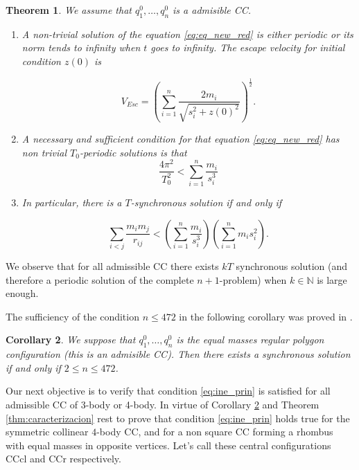 \documentclass[twoside]{article}
\newtheorem{thm}{Theorem}[section]
\newtheorem{cor}[thm]{Corollary}
\theoremstyle{remark}
\begin{document}
\begin{thm}\label{thm:prin_ine} We assume that $q_1^0,\ldots,q_n^0$ is a admisible CC.
\begin{enumerate}
 \item\label{1} A non-trivial solution of the equation \eqref{eq:eq_new_red} is either periodic or  its norm tends to infinity when $t$ goes to infinity. The escape velocity for initial condition $z(0)$ is

 \begin{equation}\label{eq:vel.esc}
 V_{Esc}=\left(\sum_{i=1}^{n}\frac{2m_i}{\sqrt{s_i^2+z(0)^2}}\right)^{\frac12}.
 \end{equation}

 \item\label{2} A necessary and sufficient condition for that equation \eqref{eq:eq_new_red} has non trivial $T_0$-periodic solutions is that
\begin{equation}\label{eq:ine_T0-per-cond}
 \frac{4\pi^2}{T_0^2}<\sum_{i=1}^n\frac{m_i}{s_i^3}
\end{equation}
\item\label{3} In particular, there is a $T$-synchronous solution if and only if

\begin{equation}\label{eq:ine_prin}
 \sum_{i<j}\frac{m_im_j}{r_{ij}}<\left(\sum_{i=1}^n\frac{m_i}{s_i^3}\right)\left(\sum_{i=1}^nm_is_i^2\right).
\end{equation}
\end{enumerate}

\end{thm}

We observe that for all admissible CC there exists $kT$ synchronous solution (and therefore a periodic solution of the complete $n+1$-problem) when $k\in \mathbb{N}$ is  large enough.

The sufficiency of the condition $n\leq 472$ in the following corollary  was proved in \cite{li2013characterization}.

\begin{cor}\label{cor:nleq472}
We suppose that $q_1^0,\ldots,q_n^0$ is the equal masses regular polygon configuration  (this is an admisible CC). Then there exists a synchronous solution if and only if $2\leq n\leq 472$.
\end{cor}




Our next objective is to verify that condition \eqref{eq:ine_prin} is satisfied for all admissible CC of 3-body or 4-body. In virtue of Corollary \ref{cor:nleq472} and Theorem \ref{thm:caracterizacion}  rest to prove that condition \eqref{eq:ine_prin} holds true for the symmetric collinear $4$-body CC, and for a non square CC forming a rhombus with equal masses in opposite vertices. Let's call these central configurations CCcl and CCr respectively.
\end{document}
